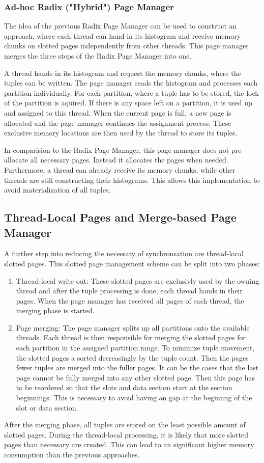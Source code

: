 \subsubsection{Ad-hoc Radix ("Hybrid") Page Manager} \label{subsubsection-Ad-hoc-Radix-Page-Manager}
The idea of the previous Radix Page Manager can be used to construct an approach, where each thread can hand in its histogram and receive memory chunks on slotted pages independently from other threads.
This page manager merges the three steps of the Radix Page Manager into one.

A thread hands in its histogram and request the memory chunks, where the tuples can be written.
The page manager reads the histogram and processes each partition individually.
For each partition, where a tuple has to be stored, the lock of the partition is aquired.
If there is any space left on a partition, it is used up and assigned to this thread.
When the current page is full, a new page is allocated and the page manager continues the assignment process.
These exclusive memory locations are then used by the thread to store its tuples.

In comparision to the Radix Page Manager, this page manager does not pre-allocate all necessary pages.
Instead it allocates the pages when needed.
Furthermore, a thread can already receive its memory chunks, while other threads are still constructing their histograms.
This allows this implementation to avoid materialization of all tuples.
\subsection{Thread-Local Pages and Merge-based Page Manager}
A further step into reducing the necessaty of synchronsation are thread-local slotted pages.
This slotted page management scheme can be split into two phases:
\begin{enumerate}
  \item Thread-local write-out: These slotted pages are exclusivly used by the owning thread and after the tuple processing is done, each thread hands in their pages.
        When the page manager has received all pages of each thread, the merging phase is started.

  \item Page merging: The page manager splits up all partitions onto the available threads.
        Each thread is then responsible for merging the slotted pages for each partition in the assigned partition range.
        To minimize tuple movement, the slotted pages a sorted decreasingly by the tuple count.
        Then the pages fewer tuples are merged into the fuller pages.
        It can be the cases that the last page cannot be fully merged into any other slotted page.
        Then this page has to be reordered so that the slots and data section start at the section beginnings.
        This is necessary to avoid having an gap at the beginnng of the slot or data section.
\end{enumerate}
After the merging phase, all tuples are stored on the least possible amount of slotted pages.
During the thread-local processing, it is likely that more slotted pages than necessary are created.
This can lead to an significant higher memory consumption than the previous approaches.
